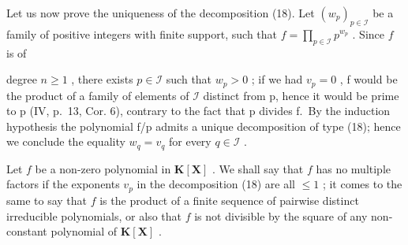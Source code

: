 Let us now prove the uniqueness of the decomposition (18). Let \((w_{p})_{p\in \mathcal{I}}\) be a family of positive integers with finite support, such that \(f = \prod_{p\in \mathcal{I}}p^{w_p}\) . Since \(f\) is of

degree \(n \geqslant 1\) , there exists \(p \in \mathcal{I}\) such that \(w_{p} > 0\) ; if we had \(v_{p} = 0\) , f would be the product of a family of elements of \(\mathcal{I}\) distinct from p, hence it would be prime to p (IV, p.~13, Cor. 6), contrary to the fact that p divides f.~By the induction hypothesis the polynomial f/p admits a unique decomposition of type (18); hence we conclude the equality \(w_{q} = v_{q}\) for every \(q \in \mathcal{I}\) .

Let \(f\) be a non-zero polynomial in \(\mathbf{K}[\mathbf{X}]\) . We shall say that \(f\) has no multiple factors if the exponents \(v_{p}\) in the decomposition (18) are all \(\leqslant 1\) ; it comes to the same to say that \(f\) is the product of a finite sequence of pairwise distinct irreducible polynomials, or also that \(f\) is not divisible by the square of any non-constant polynomial of \(\mathbf{K}[\mathbf{X}]\) .

